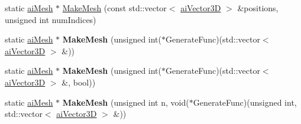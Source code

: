 \begin{DoxyCompactItemize}
\item 
static \hyperlink{structai_mesh}{ai\+Mesh} $\ast$ \hyperlink{class_assimp_1_1_standard_shapes_ac387f53194750409c1b40b7a4f331ee4}{Make\+Mesh} (const std\+::vector$<$ \hyperlink{structai_vector3_d}{ai\+Vector3\+D} $>$ \&positions, unsigned int num\+Indices)
\item 
\hypertarget{class_assimp_1_1_standard_shapes_a00559ed93325e8e39344850e99ea4a8f}{static \hyperlink{structai_mesh}{ai\+Mesh} $\ast$ {\bfseries Make\+Mesh} (unsigned int($\ast$Generate\+Func)(std\+::vector$<$ \hyperlink{structai_vector3_d}{ai\+Vector3\+D} $>$ \&))}\label{class_assimp_1_1_standard_shapes_a00559ed93325e8e39344850e99ea4a8f}

\item 
\hypertarget{class_assimp_1_1_standard_shapes_a1c53825c742b9bcdfaee14369581e67f}{static \hyperlink{structai_mesh}{ai\+Mesh} $\ast$ {\bfseries Make\+Mesh} (unsigned int($\ast$Generate\+Func)(std\+::vector$<$ \hyperlink{structai_vector3_d}{ai\+Vector3\+D} $>$ \&, bool))}\label{class_assimp_1_1_standard_shapes_a1c53825c742b9bcdfaee14369581e67f}

\item 
\hypertarget{class_assimp_1_1_standard_shapes_a370fb69515ec84c16c375213f465f02a}{static \hyperlink{structai_mesh}{ai\+Mesh} $\ast$ {\bfseries Make\+Mesh} (unsigned int n, void($\ast$Generate\+Func)(unsigned int, std\+::vector$<$ \hyperlink{structai_vector3_d}{ai\+Vector3\+D} $>$ \&))}\label{class_assimp_1_1_standard_shapes_a370fb69515ec84c16c375213f465f02a}


\end{DoxyCompactItemize}
